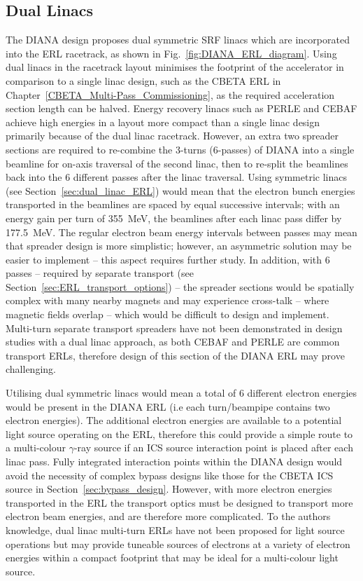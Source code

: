 \documentclass[../main.tex]{subfiles}
\begin{document}
\subsection{Dual Linacs}

The DIANA design proposes dual symmetric SRF linacs which are incorporated into the ERL racetrack, as shown in Fig.~\ref{fig:DIANA_ERL_diagram}. Using dual linacs in the racetrack layout minimises the footprint of the accelerator in comparison to a single linac design, such as the CBETA ERL in Chapter~\ref{CBETA_Multi-Pass_Commissioning}, as the required acceleration section length can be halved. Energy recovery linacs such as PERLE \cite{angal2018perle} and CEBAF \cite{meot2016er} achieve high energies in a layout more compact than a single linac design primarily because of the dual linac racetrack. However, an extra two spreader sections are required to re-combine the 3-turns (6-passes) of DIANA into a single beamline for on-axis traversal of the second linac, then to re-split the beamlines back into the 6 different passes after the linac traversal. Using symmetric linacs (see Section~\ref{sec:dual_linac_ERL}) would mean that the electron bunch energies transported in the beamlines are spaced by equal successive intervals; with an energy gain per turn of 355~\si{\mega\electronvolt}, the beamlines after each linac pass differ by 177.5~\si{\mega\electronvolt}. The regular electron beam energy intervals between passes may mean that spreader design is more simplistic; however, an asymmetric solution may be easier to implement -- this aspect requires further study. In addition, with 6 passes -- required by separate transport (see Section~\ref{sec:ERL_transport_options}) -- the spreader sections would be spatially complex with many nearby magnets and may experience cross-talk -- where magnetic fields overlap -- which would be difficult to design and implement. Multi-turn separate transport spreaders have not been demonstrated in design studies with a dual linac approach, as both CEBAF \cite{meot2016er} and PERLE \cite{angal2018perle} are common transport ERLs, therefore design of this section of the DIANA ERL may prove challenging. 

Utilising dual symmetric linacs would mean a total of 6 different electron energies would be present in the DIANA ERL (i.e each turn/beampipe contains two electron energies). The additional electron energies are available to a potential light source operating on the ERL, therefore this could provide a simple route to a multi-colour $\gamma$-ray source if an ICS source interaction point is placed after each linac pass. Fully integrated interaction points within the DIANA design would avoid the necessity of complex bypass designs like those for the CBETA ICS source in Section~\ref{sec:bypass_design}. However, with more electron energies transported in the ERL the transport optics must be designed to transport more electron beam energies, and are therefore more complicated. To the authors knowledge, dual linac multi-turn ERLs have not been proposed for light source operations but may provide tuneable sources of electrons at a variety of electron energies within a compact footprint that may be ideal for a multi-colour light source.
\end{document}
